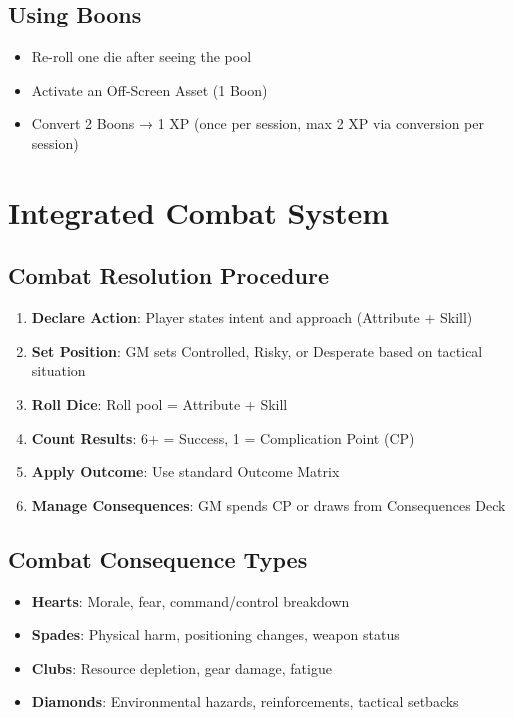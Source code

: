 \documentclass[11pt]{article}
\begin{document}
\subsection{Using Boons}
\begin{itemize}
    \item Re-roll one die after seeing the pool
    \item Activate an Off-Screen Asset (1 Boon)
    \item Convert 2 Boons → 1 XP (once per session, max 2 XP via conversion per session)
\end{itemize}

\section{Integrated Combat System}

\subsection{Combat Resolution Procedure}
\begin{enumerate}
    \item \textbf{Declare Action}: Player states intent and approach (Attribute + Skill)
    \item \textbf{Set Position}: GM sets Controlled, Risky, or Desperate based on tactical situation
    \item \textbf{Roll Dice}: Roll pool = Attribute + Skill
    \item \textbf{Count Results}: 6+ = Success, 1 = Complication Point (CP)
    \item \textbf{Apply Outcome}: Use standard Outcome Matrix
    \item \textbf{Manage Consequences}: GM spends CP or draws from Consequences Deck
\end{enumerate}

\subsection{Combat Consequence Types}
\begin{itemize}
    \item \textbf{Hearts}: Morale, fear, command/control breakdown
    \item \textbf{Spades}: Physical harm, positioning changes, weapon status
    \item \textbf{Clubs}: Resource depletion, gear damage, fatigue
    \item \textbf{Diamonds}: Environmental hazards, reinforcements, tactical setbacks
\end{itemize}
\end{document}
